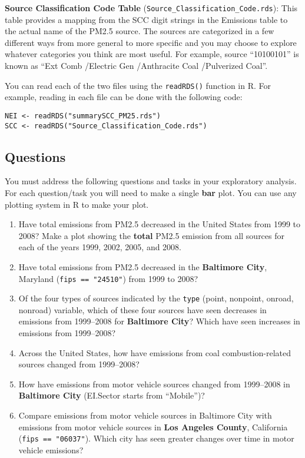 \documentclass[
]{article}
\providecommand{\tightlist}{%
  \setlength{\itemsep}{0pt}\setlength{\parskip}{0pt}}
\begin{document}
\textbf{Source Classification Code Table}
(\texttt{Source\_Classification\_Code.rds}): This table provides a
mapping from the SCC digit strings in the Emissions table to the actual
name of the PM2.5 source. The sources are categorized in a few different
ways from more general to more specific and you may choose to explore
whatever categories you think are most useful. For example, source
``10100101'' is known as ``Ext Comb /Electric Gen /Anthracite Coal
/Pulverized Coal''.

You can read each of the two files using the \texttt{readRDS()} function
in R. For example, reading in each file can be done with the following
code:

\begin{verbatim}
NEI <- readRDS("summarySCC_PM25.rds")
SCC <- readRDS("Source_Classification_Code.rds")
\end{verbatim}

\hypertarget{questions}{%
\subsection{Questions}\label{questions}}

You must address the following questions and tasks in your exploratory
analysis. For each question/task you will need to make a single
\textbf{bar} plot. You can use any plotting system in R to make your
plot.

\begin{enumerate}
\def\labelenumi{\arabic{enumi}.}
\tightlist
\item
  Have total emissions from PM2.5 decreased in the United States from
  1999 to 2008? Make a plot showing the \textbf{total} PM2.5 emission
  from all sources for each of the years 1999, 2002, 2005, and 2008.
\item
  Have total emissions from PM2.5 decreased in the \textbf{Baltimore
  City}, Maryland (\texttt{fips\ ==\ "24510"}) from 1999 to 2008?
\item
  Of the four types of sources indicated by the \texttt{type} (point,
  nonpoint, onroad, nonroad) variable, which of these four sources have
  seen decreases in emissions from 1999--2008 for \textbf{Baltimore
  City}? Which have seen increases in emissions from 1999--2008?
\item
  Across the United States, how have emissions from coal
  combustion-related sources changed from 1999--2008?
\item
  How have emissions from motor vehicle sources changed from 1999--2008
  in \textbf{Baltimore City} (EI.Sector starts from ``Mobile'')?
\item
  Compare emissions from motor vehicle sources in Baltimore City with
  emissions from motor vehicle sources in \textbf{Los Angeles County},
  California (\texttt{fips\ ==\ "06037"}). Which city has seen greater
  changes over time in motor vehicle emissions?
\end{enumerate}
\end{document}
